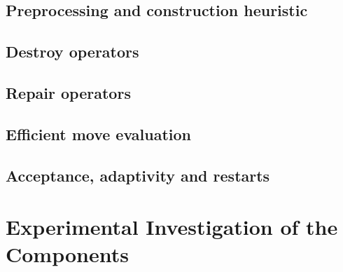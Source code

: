 \documentclass[10pt, a4paper]{article}
\begin{document}
\subsection{Preprocessing and construction heuristic}
\subsection{Destroy operators}
\subsection{Repair operators}
\subsection{Efficient move evaluation}
\subsection{Acceptance, adaptivity and restarts}

\section{Experimental Investigation of the Components}
\end{document}
